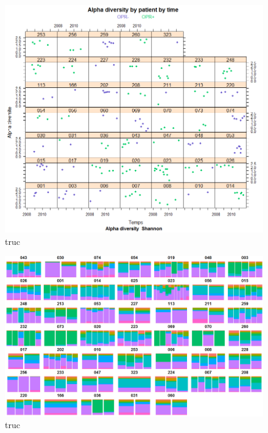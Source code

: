 \documentclass[12pt,a4paper]{article}
\begin{document}
\begin{figure}[h]
\begin{center}
\includegraphics[scale=0.5]{img/all_alpha_shanon.png}\hfill
\end{center}
\caption{truc}
\label{shannon}
\end{figure}


\begin{figure}[h]
\begin{center}
\includegraphics[scale=0.5]{img/evolution_Core.png}\hfill
\end{center}
\caption{truc}
\label{shannon}
\end{figure}
\end{document}
